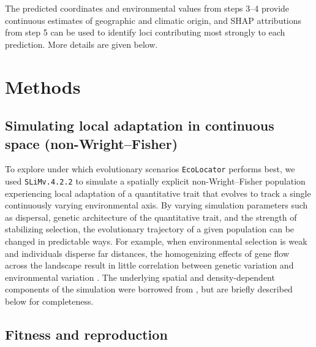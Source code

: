 \documentclass[]{article}
\newcommand{\ecolocator}{\texttt{EcoLocator}\xspace}
\newcommand{\slim}{\texttt{SLiM}\xspace}
\begin{document}
The predicted coordinates and environmental values from steps 3--4 provide 
continuous estimates of geographic and climatic origin, and SHAP attributions 
from step 5 can be used to identify loci contributing most strongly to each prediction.
More details are given below. 

\section{Methods}

\subsection{Simulating local adaptation in continuous space (non-Wright--Fisher)}

To explore under which evolutionary scenarios \ecolocator performs best,
we used \slim \texttt{v.4.2.2} \citep{haller2023slim4} 
to simulate a spatially explicit non-Wright--Fisher population
experiencing local adaptation of a quantitative trait
that evolves to track a single continuously varying environmental axis.
By varying simulation parameters such as dispersal, genetic architecture of the quantitative trait,
and the strength of stabilizing selection,
the evolutionary trajectory of a given population
can be changed in predictable ways.
For example, when environmental selection is weak
and individuals disperse far distances,
the homogenizing effects of gene flow across the landscape
result in little correlation between genetic variation and environmental variation
\citep{lenormand_gene_2002,kawecki_conceptual_2004,booker_wza_2024}.
The underlying spatial and density-dependent components of the 
simulation were borrowed from \citet{chevy_popgen_ecology_2025},
but are briefly described below for completeness.

\subsection{Fitness and reproduction}
\end{document}
